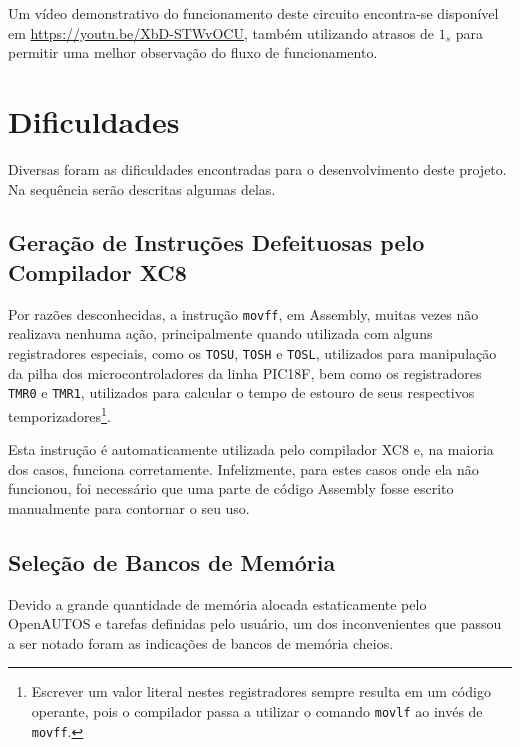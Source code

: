 

Um vídeo demonstrativo do funcionamento deste circuito encontra-se disponível em \url{https://youtu.be/XbD-STWvOCU}, também utilizando atrasos de $1_s$ para permitir uma melhor observação do fluxo de funcionamento.

\section{Dificuldades}

Diversas foram as dificuldades encontradas para o desenvolvimento deste projeto. Na sequência serão descritas algumas delas.

\subsection{Geração de Instruções Defeituosas pelo Compilador XC8}

Por razões desconhecidas, a instrução \texttt{movff}, em Assembly, muitas vezes não realizava nenhuma ação, principalmente quando utilizada com alguns registradores especiais, como os \texttt{TOSU}, \texttt{TOSH} e \texttt{TOSL}, utilizados para manipulação da pilha dos microcontroladores da linha PIC18F, bem como os registradores \texttt{TMR0} e \texttt{TMR1}, utilizados para calcular o tempo de estouro de seus respectivos temporizadores\footnote{Escrever um valor literal nestes registradores sempre resulta em um código operante, pois o compilador passa a utilizar o comando \texttt{movlf} ao invés de \texttt{movff}.}.

Esta instrução é automaticamente utilizada pelo compilador XC8 e, na maioria dos casos, funciona corretamente. Infelizmente, para estes casos onde ela não funcionou, foi necessário que uma parte de código Assembly fosse escrito manualmente para contornar o seu uso.

\subsection{Seleção de Bancos de Memória}

Devido a grande quantidade de memória alocada estaticamente pelo OpenAUTOS e tarefas definidas pelo usuário, um dos inconvenientes que passou a ser notado foram as indicações de bancos de memória cheios.

